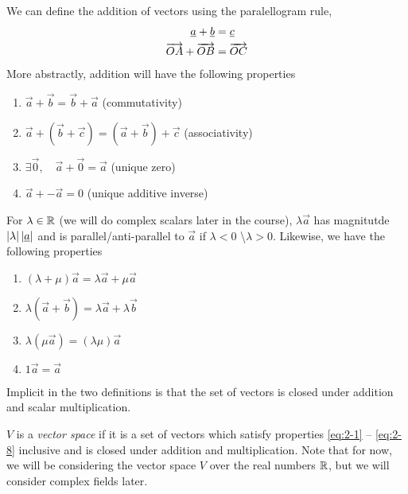 \documentclass{article}
\numberwithin{equation}{section}
\begin{document}
\begin{defi}
    We can define the addition of vectors using the paralellogram rule,
    \begin{align*}
        \underline{a} + \underline{b} &= \underline{c} \\
        \overrightarrow{OA} + \overrightarrow{OB} &= \overrightarrow{OC}
    \end{align*}
    More abstractly, addition will have the following properties
    \begin{enumerate}[eqn]
        \item $\vec{a} + \vec{b} = \vec{b} + \vec{a}$ \hspace*{\fill}(commutativity) \label{eq:2-1}
        \item $\vec{a} + (\vec{b} + \vec{c}) = (\vec{a} + \vec{b}) + \vec{c}$ \hspace*{\fill}(associativity) \label{eq:2-2}
        \item $\exists \vec{0}, \quad \vec{a} + \vec{0} = \vec{a}$ \hspace*{\fill}(unique zero) \label{eq:2-3}
        \item $\vec{a} + -\vec{a} = 0$ \hspace*{\fill}(unique additive inverse) \label{eq:2-4}
    \end{enumerate}
\end{defi}
\begin{defi}
    For $\lambda \in \mathbb{R}$ (we will do complex scalars later in the course), $\lambda\vec{a}$ has magnitutde $\left\lvert \lambda\right\rvert\left\lvert \underline{a}\right\rvert$ and is parallel/anti-parallel to $\vec{a}$ if $\lambda<0$ \textbackslash $\lambda>0$. 
    Likewise, we have the following properties
    \begin{enumerate}[eqn]
        \item $(\lambda + \mu)\vec{a} = \lambda\vec{a} + \mu\vec{a}$ \label{eq:2-5}
        \item $\lambda(\vec{a} + \vec{b}) = \lambda\vec{a} + \lambda\vec{b}$ \label{eq:2-6}
        \item $\lambda(\mu\vec{a}) = (\lambda\mu)\vec{a}$ \label{eq:2-7}
        \item $1\vec{a} = \vec{a}$ \label{eq:2-8}
    \end{enumerate}
\end{defi}

Implicit in the two definitions is that the set of vectors is closed under addition and scalar multiplication.

\begin{defi}
    $V$ is a \emph{vector space} if it is a set of vectors which satisfy properties \eqref{eq:2-1} -- \eqref{eq:2-8} inclusive and is closed under addition and multiplication. Note that for now, we will be considering the vector space $V$ over the real numbers $\mathbb{R}$, but we will consider complex fields later. 
\end{defi}
\end{document}
